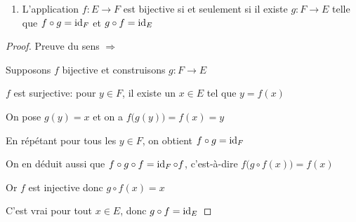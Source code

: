 \begin{frame}

\begin{proposition}
\begin{enumerate}
  \item L'application $f : E \to F$ est bijective si et seulement si il existe $g : F \to E$
telle que $f \circ g = \mathop{\text{id}}\nolimits_F$ et $g \circ f = \mathop{\text{id}}\nolimits_E$
\end{enumerate}
\end{proposition}

\medskip
\pause

\begin{proof} 
Preuve du sens $\Rightarrow$ 

\pause
\medskip

Supposons $f$ bijective et construisons $g : F \to E$ 

\pause

$f$ est surjective: pour $y \in F$, il existe un $x \in E$ tel que $y=f(x)$

\pause

On pose $g(y)=x$ et on a $f\big( g(y) \big) = f(x) =y$

\pause

En répétant pour tous les $y\in F$, on obtient $f \circ g = \mathop{\text{id}}\nolimits_F$

\pause

On en déduit aussi que $f \circ g \circ f = \mathop{\text{id}}\nolimits_F \circ f$,
\pause
c'est-à-dire $f\big( g\circ f(x) \big) = f(x)$

\pause

Or $f$ est injective donc $g\circ f(x)=x$

\pause

C'est vrai pour tout $x\in E$, donc $g\circ f =\mathop{\text{id}}\nolimits_E$

\end{proof}
\end{frame}




